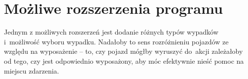 \documentclass{article}
\begin{document}
\section{Możliwe rozszerzenia programu}
Jednym z możliwych rozszerzeń jest dodanie różnych typów wypadków i~możliwość wyboru wypadku. Nadałoby to sens rozróżnieniu pojazdów ze względu na wyposażenie -- to, czy pojazd mógłby wyruszyć do~akcji zależałoby od tego, czy jest odpowiednio wyposażony, aby móc efektywnie nieść pomoc na miejscu zdarzenia.
\end{document}
